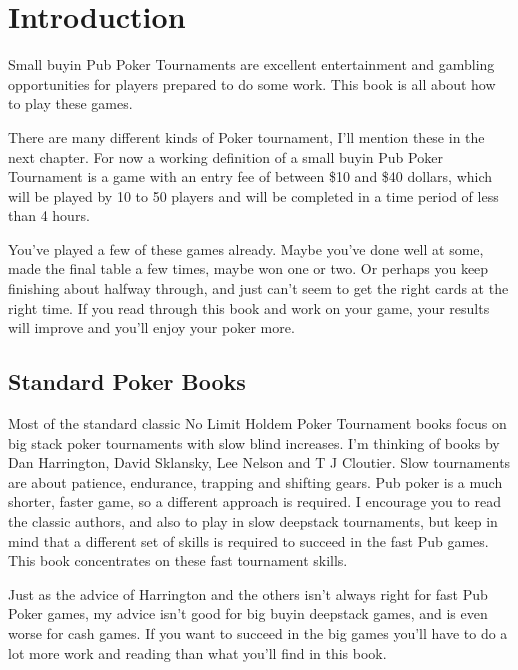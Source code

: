 \chapter{Introduction}


Small buyin Pub Poker Tournaments are excellent entertainment and
gambling opportunities for players prepared to do some work. This
book is all about how to play these games.

There are many different kinds of Poker tournament, I'll mention these
in the next chapter. For now a working definition of a small buyin
Pub Poker Tournament is a game with an entry fee of between \$10
and \$40 dollars, which will be played by 10 to 50 players
and will be completed in a time period of less than 4 hours.

You've played a few of these games already. Maybe you've done well at some,
made the final table a few times, maybe won one or two.
Or perhaps you keep finishing about halfway through, and just can't seem to
get the right cards at the right time. If you read through this book and
work on your game, your results will improve and you'll enjoy your poker more.

\section*{Standard Poker Books}


Most of the standard classic No Limit Holdem Poker Tournament books
focus on big stack poker tournaments with slow blind increases.
I'm thinking of books by Dan Harrington, David Sklansky, Lee Nelson
and T J Cloutier. Slow tournaments are about patience, endurance,
trapping and shifting gears. Pub poker is a much
shorter, faster game, so a different approach
is required. I encourage you to read the
classic authors, and also to play in slow deepstack tournaments,
but keep in mind that a different set of skills is required to succeed
in the fast Pub games. This book concentrates on these fast
tournament skills.

Just as the advice of Harrington and the others isn't always right
for fast Pub Poker games, my advice isn't good
for big buyin deepstack games, and is even worse for
cash games. If you want to succeed in the big games you'll have to do a
lot more work and reading than what you'll find in this book.

